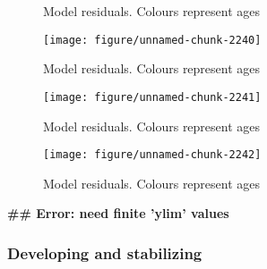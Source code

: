 \documentclass[a4paper]{article}\usepackage{graphicx, color}
\makeatletter
\def\maxwidth{ %
  \ifdim\Gin@nat@width>\linewidth
    \linewidth
  \else
    \Gin@nat@width
  \fi
}
\newenvironment{kframe}{%
 \def\at@end@of@kframe{}%
 \ifinner\ifhmode%
  \def\at@end@of@kframe{\end{minipage}}%
  \begin{minipage}{\columnwidth}%
 \fi\fi%
 \def\FrameCommand##1{\hskip\@totalleftmargin \hskip-\fboxsep
 \colorbox{shadecolor}{##1}\hskip-\fboxsep
     \hskip-\linewidth \hskip-\@totalleftmargin \hskip\columnwidth}%
 \MakeFramed {\advance\hsize-\width
   \@totalleftmargin\z@ \linewidth\hsize
   \@setminipage}}%
 {\par\unskip\endMakeFramed%
 \at@end@of@kframe}
\newenvironment{knitrout}{}{} %
\makeatother
\begin{document}
\begin{knitrout}
\begin{figure}[H]
\caption[Model residuals]{Model residuals. Colours represent ages\label{fig:unnamed-chunk-2239}}
\end{figure}
\begin{figure}[H]


{\centering \texttt{[image: figure/unnamed-chunk-2240]} 

}

\caption[Model residuals]{Model residuals. Colours represent ages\label{fig:unnamed-chunk-2240}}
\end{figure}
\begin{figure}[H]


{\centering \texttt{[image: figure/unnamed-chunk-2241]} 

}

\caption[Model residuals]{Model residuals. Colours represent ages\label{fig:unnamed-chunk-2241}}
\end{figure}
\begin{figure}[H]


{\centering \texttt{[image: figure/unnamed-chunk-2242]} 

}

\caption[Model residuals]{Model residuals. Colours represent ages\label{fig:unnamed-chunk-2242}}
\end{figure}
\begin{kframe}

{\ttfamily\noindent\bfseries\textcolor{errorcolor}{\#\# Error: need finite 'ylim' values}}\end{kframe}
\end{knitrout}


\subsubsection*{Developing and stabilizing}
\end{document}
